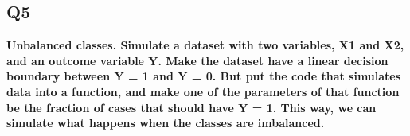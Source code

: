 \documentclass[]{article}
\newenvironment{Shaded}{\begin{snugshade}}{\end{snugshade}}
\newcommand{\KeywordTok}[1]{\textcolor[rgb]{0.13,0.29,0.53}{\textbf{#1}}}
\newcommand{\DataTypeTok}[1]{\textcolor[rgb]{0.13,0.29,0.53}{#1}}
\newcommand{\DecValTok}[1]{\textcolor[rgb]{0.00,0.00,0.81}{#1}}
\newcommand{\FloatTok}[1]{\textcolor[rgb]{0.00,0.00,0.81}{#1}}
\newcommand{\StringTok}[1]{\textcolor[rgb]{0.31,0.60,0.02}{#1}}
\newcommand{\CommentTok}[1]{\textcolor[rgb]{0.56,0.35,0.01}{\textit{#1}}}
\newcommand{\ControlFlowTok}[1]{\textcolor[rgb]{0.13,0.29,0.53}{\textbf{#1}}}
\newcommand{\OperatorTok}[1]{\textcolor[rgb]{0.81,0.36,0.00}{\textbf{#1}}}
\newcommand{\NormalTok}[1]{#1}
\begin{document}
\subsection{Q5}\label{q5}

\textbf{Unbalanced classes. Simulate a dataset with two variables, X1
and X2, and an outcome variable Y. Make the dataset have a linear
decision boundary between Y = 1 and Y = 0. But put the code that
simulates data into a function, and make one of the parameters of that
function be the fraction of cases that should have Y = 1. This way, we
can simulate what happens when the classes are imbalanced.}

\begin{Shaded}
\end{Shaded}
\end{document}
